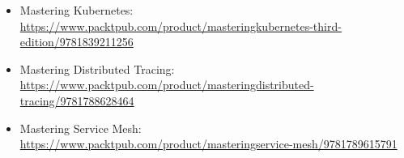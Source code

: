 

\begin{itemize}
\item 
Mastering Kubernetes: \url{https://www.packtpub.com/product/masteringkubernetes-third-edition/9781839211256}

\item 
Mastering Distributed Tracing: \url{https://www.packtpub.com/product/masteringdistributed-tracing/9781788628464}

\item 
Mastering Service Mesh: \url{https://www.packtpub.com/product/masteringservice-mesh/9781789615791}
\end{itemize}